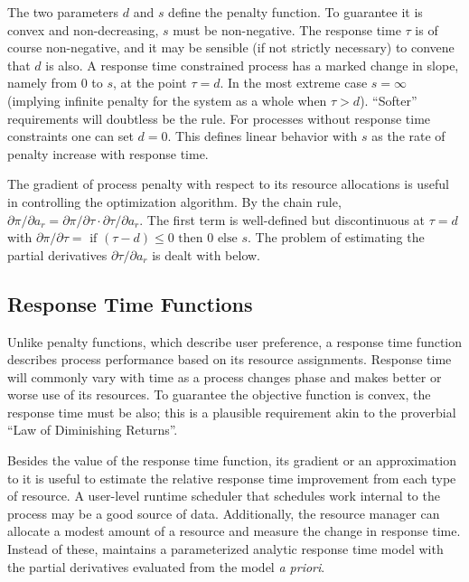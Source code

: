 The two parameters $d$ and $s$ define the penalty function.
To guarantee it is convex and non-decreasing, $s$ must be non-negative.
The response time $\tau$  is of course non-negative,
and it may be sensible (if not strictly necessary) to convene that $d$ is also.
A response time constrained process has a marked change in slope, namely from 0 to $s$, at the point $\tau= d$.
In the most extreme case $s = \infty$ (implying infinite penalty for the system as a whole when $\tau > d$).  ``Softer'' requirements will doubtless be the rule.
For processes without response time constraints one can set $d = 0$.
This defines linear behavior with $s$ as the rate of penalty increase with response time.

The gradient of process penalty with respect to its resource allocations is useful in controlling the optimization algorithm.
By the chain rule, $\partial\pi/\partial a_r = \partial\pi/\partial\tau\cdot\partial\tau/\partial a_r$.
The first term is well-defined but discontinuous at $\tau = d$ with
$\partial\pi/\partial\tau = \mbox{ if } (\tau - d) \leq 0 \mbox{ then } 0 \mbox{ else } s$.
The problem of estimating the partial derivatives $\partial\tau/\partial a_r$ is dealt with below.


\subsection*{Response Time Functions}

Unlike penalty functions, which describe user preference, a response time function describes process performance based on its resource assignments.
Response time will commonly vary with time as a process changes phase and makes better or worse use of its resources.
To guarantee the objective function is convex, the response time must be also;
this is a plausible requirement akin to the proverbial ``Law of Diminishing Returns''.

Besides the value of the response time function, its gradient or an approximation to it is useful to estimate the relative response time improvement from each type of resource.  A user-level runtime scheduler that schedules work internal to the process may be a good source of data.
Additionally, the resource manager can allocate a modest amount of a resource and measure the change in response time.
Instead of these, \pacora maintains a parameterized analytic response time model with the partial derivatives evaluated from the model \emph{a priori}.

